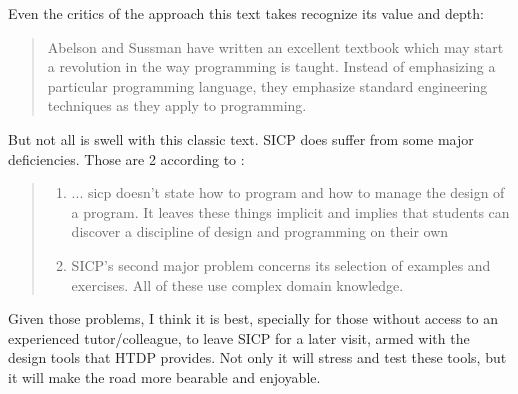Even the critics of the approach this text takes recognize its value and
depth: 

\begin{quotation}
    Abelson and Sussman have written an excellent textbook  which may start a
    revolution in the way programming is taught.
    Instead of emphasizing a particular programming language, they emphasize standard
    engineering techniques as they apply to programming.
    \cite{education:wadler__a_critique_of_abelson_and_sussman}
\end{quotation}

But not all is swell with this classic text. SICP does suffer from some
major deficiencies. Those are 2 according to \cite{education:felleisen__sicsc}:

\begin{quote}
    \begin{enumerate}
        \item ... sicp doesn’t state how to program and how to manage the design
        of a program. It leaves these things implicit and implies that students
        can discover a discipline of design and programming on their own

        \item SICP’s second major problem concerns its selection of examples and
        exercises. All of these use complex domain knowledge.
    \end{enumerate}
\end{quote}

Given those problems, I think it is best, specially for those without access to
an experienced tutor/colleague, to leave SICP for a later visit, armed with the
design tools that HTDP provides. Not only it will stress and test these tools,
but it will make the road more bearable and enjoyable.
